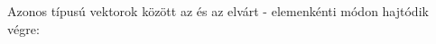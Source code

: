 Azonos típusú vektorok között az \mcode{$+$} és \mcode{$-$} az elvárt - elemenkénti 
módon hajtódik végre:
